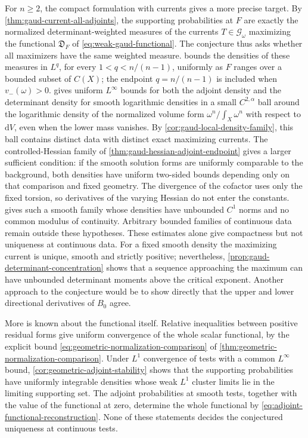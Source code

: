 For $n\geq2$, the compact formulation with currents gives a more precise target. By \cref{thm:gaud-current-all-adjoints}, the supporting probabilities at $F$ are exactly the normalized determinant-weighted measures of the currents $T\in\mathscr G_\omega$ maximizing the functional $\mathfrak D_F$ of \eqref{eq:weak-gaud-functional}. The conjecture thus asks whether all maximizers have the same weighted measure.  bounds the densities of these measures in $L^q$, for every $1<q<n/(n-1)$, uniformly as $F$ ranges over a bounded subset of $C(X)$; the endpoint $q=n/(n-1)$ is included when $v_-(\omega)>0$.  gives uniform $L^\infty$ bounds for both the adjoint density and the determinant density for smooth logarithmic densities in a small $C^{2,\alpha}$ ball around the logarithmic density of the normalized volume form $\omega^n/\int_X\omega^n$ with respect to $\mathrm{d}V$, even when the lower mass vanishes. By \cref{cor:gaud-local-density-family}, this ball contains distinct data with distinct exact maximizing currents. The controlled-Hessian family of \cref{thm:gaud-hessian-adjoint-endpoint} gives a larger sufficient condition: if the smooth solution forms are uniformly comparable to the background, both densities have uniform two-sided bounds depending only on that comparison and fixed geometry. The divergence of the cofactor uses only the fixed torsion, so derivatives of the varying Hessian do not enter the constants.  gives such a smooth family whose densities have unbounded $C^1$ norms and no common modulus of continuity. Arbitrary bounded families of continuous data remain outside these hypotheses. These estimates alone give compactness but not uniqueness at continuous data. For a fixed smooth density the maximizing current is unique, smooth and strictly positive; nevertheless, \cref{prop:gaud-determinant-concentration} shows that a sequence approaching the maximum can have unbounded determinant moments above the critical exponent. Another approach to the conjecture would be to show directly that the upper and lower directional derivatives of $B_0$ agree.

More is known about the functional itself. Relative inequalities between positive residual forms give uniform convergence of the whole scalar functional, by the explicit bound \eqref{eq:geometric-normalization-comparison} of \cref{thm:geometric-normalization-comparison}. Under $L^1$ convergence of tests with a common $L^\infty$ bound, \cref{cor:geometric-adjoint-stability} shows that the supporting probabilities have uniformly integrable densities whose weak $L^1$ cluster limits lie in the limiting supporting set. The adjoint probabilities at smooth tests, together with the value of the functional at zero, determine the whole functional by \eqref{eq:adjoint-functional-reconstruction}. None of these statements decides the conjectured uniqueness at continuous tests.

